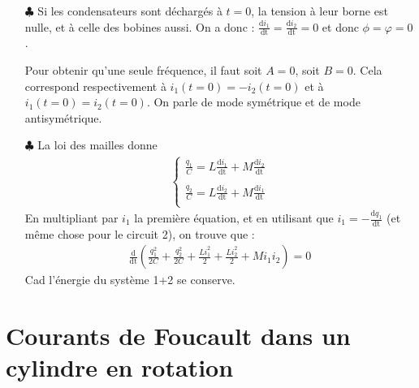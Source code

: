 \documentclass{report}
\begin{document}
\begin{itemize}
	\item[$\clubsuit$] Si les condensateurs sont déchargés à $t=0$, la tension à leur borne est nulle, et à celle des bobines aussi. On a donc : $\frac{\mathrm{d}i_1}{\mathrm{dt}}=\frac{\mathrm{d}i_2}{\mathrm{dt}}=0$ et donc $\phi=\varphi=0$.
	
	Pour obtenir qu'une seule fréquence, il faut soit $A=0$, soit $B=0$. Cela correspond respectivement à $i_1(t=0)=-i_2(t=0)$ et à $i_1(t=0)=i_2(t=0)$. On parle de mode symétrique et de mode antisymétrique. 
	
	\item[$\clubsuit$] La loi des mailles donne
		\begin{align*}
	\left\lbrace
	\begin{array}{ccc}
	\frac{q_1}{C}=L\frac{\mathrm{d}i_1}{\mathrm{dt}}+M\frac{\mathrm{d}i_2}{\mathrm{dt}}\\
	\\
	\frac{q_2}{C}=L\frac{\mathrm{d}i_2}{\mathrm{dt}}+M\frac{\mathrm{d}i_1}{\mathrm{dt}}\\
	\end{array}\right.
	\end{align*}		
En multipliant par $i_1$ la première équation, et en utilisant que $i_1=-\frac{\mathrm{d}q_1}{\mathrm{dt}}$ (et même chose pour le circuit 2), on trouve que :
\begin{align*}
	\frac{\mathrm{d}}{\mathrm{dt}}\left(\frac{q_1^2}{2C}+\frac{q_2^2}{2C}+\frac{Li_1^2}{2}+\frac{Li_2^2}{2}+Mi_1i_2 \right) =0
\end{align*}
Cad l'énergie du système 1+2 se conserve.
	 
\end{itemize}

\section*{Courants de Foucault dans un cylindre en rotation}
\end{document}
